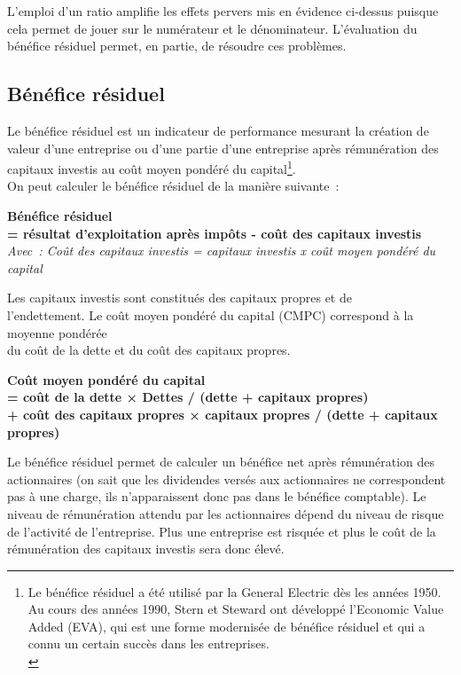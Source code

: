 \documentclass{kaobook}
\begin{document}
L'emploi d'un ratio amplifie les effets pervers mis en évidence ci-dessus puisque cela permet de jouer sur le numérateur et le dénominateur. L'évaluation du bénéfice résiduel permet, en partie, de résoudre ces problèmes.\\
\subsection{Bénéfice résiduel}
\label{sec:orgf7b8b85}
Le bénéfice résiduel est un indicateur de performance mesurant la création de valeur d'une entreprise ou d'une partie d'une entreprise après rémunération des capitaux investis au coût moyen pondéré du capital\footnote{Le bénéfice résiduel a été utilisé par la General Electric dès les années 1950. Au cours des années 1990, Stern et Steward ont développé l'Economic Value Added (EVA), qui est une forme modernisée de bénéfice résiduel et qui a connu un certain succès dans les entreprises.\\}.\\

On peut calculer le bénéfice résiduel de la manière suivante :\\
\begin{center}
\textbf{Bénéfice résiduel}\\
\textbf{= résultat d'exploitation après impôts - coût des capitaux investis}\\
\emph{Avec : Coût des capitaux investis = capitaux investis x coût moyen pondéré du\\
capital}\\
\end{center}
Les capitaux investis sont constitués des capitaux propres et de\\
l'endettement. Le coût moyen pondéré du capital (CMPC) correspond à la moyenne pondérée\\
du coût de la dette et du coût des capitaux propres.\\
\begin{center}
\textbf{Coût moyen pondéré du capital} \\
\textbf{=  coût de la dette × Dettes / (dette + capitaux propres)} \\
\textbf{+ coût des capitaux propres × capitaux propres / (dette + capitaux propres)}\\
\end{center}

Le bénéfice résiduel permet de calculer un bénéfice net après rémunération des actionnaires (on sait que les dividendes versés aux actionnaires ne correspondent pas à une charge, ils n'apparaissent donc pas dans le bénéfice comptable). Le niveau de rémunération attendu par les actionnaires dépend du niveau de risque de l'activité de l'entreprise. Plus une entreprise est risquée et plus le coût de la rémunération des capitaux investis sera donc élevé.\\
\end{document}
